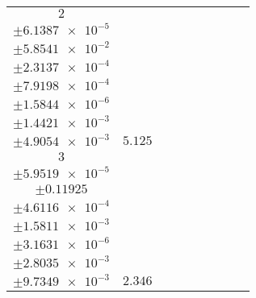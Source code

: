 \documentclass[8pt]{article}
\begin{document}
\begin{longtable}[l]{c c c c c c c c c}
$\num{2}$ & \begin{tabular}[c]{@{}c@{}}$\num{6.066e-2}$ \\ $\pm\num{6.1387e-5}$\end{tabular} & \begin{tabular}[c]{@{}c@{}}$\num{-0.31591}$ \\ $\pm\num{5.8541e-2}$\end{tabular} & \begin{tabular}[c]{@{}c@{}}$\num{-5.2052}$ \\ $\pm\num{2.3137e-4}$\end{tabular} & \begin{tabular}[c]{@{}c@{}}$\num{632.65}$ \\ $\pm\num{7.9198e-4}$\end{tabular} & \begin{tabular}[c]{@{}c@{}}$\num{1.2656}$ \\ $\pm\num{1.5844e-6}$\end{tabular} & \begin{tabular}[c]{@{}c@{}}$\num{1.1722}$ \\ $\pm\num{1.4421e-3}$\end{tabular} & \begin{tabular}[c]{@{}c@{}}$\num{4.1975}$ \\ $\pm\num{4.9054e-3}$\end{tabular} & $\num{5.125}$\\
$\num{3}$ & \begin{tabular}[c]{@{}c@{}}$\num{2.937e-2}$ \\ $\pm\num{5.9519e-5}$\end{tabular} & \begin{tabular}[c]{@{}c@{}}$\num{0.48896}$ \\ $\pm\num{0.11925}$\end{tabular} & \begin{tabular}[c]{@{}c@{}}$\num{-1.9108}$ \\ $\pm\num{4.6116e-4}$\end{tabular} & \begin{tabular}[c]{@{}c@{}}$\num{635.93}$ \\ $\pm\num{1.5811e-3}$\end{tabular} & \begin{tabular}[c]{@{}c@{}}$\num{1.2722}$ \\ $\pm\num{3.1631e-6}$\end{tabular} & \begin{tabular}[c]{@{}c@{}}$\num{1.1354}$ \\ $\pm\num{2.8035e-3}$\end{tabular} & \begin{tabular}[c]{@{}c@{}}$\num{4.1376}$ \\ $\pm\num{9.7349e-3}$\end{tabular} & $\num{2.346}$\\

\end{longtable}
\end{document}
